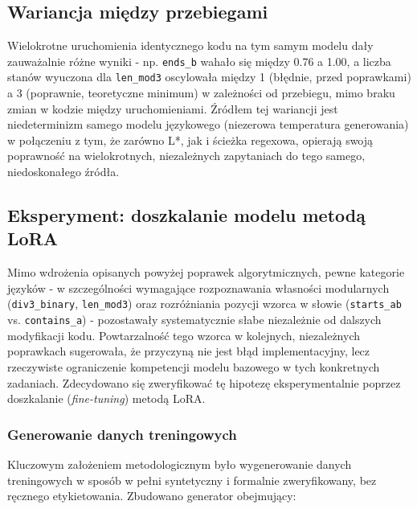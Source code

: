 \documentclass[12pt]{article}
\begin{document}
\subsection{Wariancja między przebiegami}
\label{subsec:wariancja}

Wielokrotne uruchomienia identycznego kodu na tym samym modelu dały zauważalnie różne wyniki - np. \texttt{ends\_b} wahało się między 0.76 a 1.00, a liczba stanów wyuczona dla \texttt{len\_mod3} oscylowała między 1 (błędnie, przed poprawkami) a 3 (poprawnie, teoretyczne minimum) w zależności od przebiegu, mimo braku zmian w kodzie między uruchomieniami. Źródłem tej wariancji jest niedeterminizm samego modelu językowego (niezerowa temperatura generowania) w połączeniu z tym, że zarówno L*, jak i ścieżka regexowa, opierają swoją poprawność na wielokrotnych, niezależnych zapytaniach do tego samego, niedoskonałego źródła. 

\subsection{Eksperyment: doszkalanie modelu metodą LoRA}
\label{subsec:finetuning} \cite{hu2022}

Mimo wdrożenia opisanych powyżej poprawek algorytmicznych, pewne kategorie języków - w szczególności wymagające rozpoznawania własności modularnych (\texttt{div3\_binary}, \texttt{len\_mod3}) oraz rozróżniania pozycji wzorca w słowie (\texttt{starts\_ab} vs. \texttt{contains\_a}) - pozostawały systematycznie słabe niezależnie od dalszych modyfikacji kodu. Powtarzalność tego wzorca w kolejnych, niezależnych poprawkach sugerowała, że przyczyną nie jest błąd implementacyjny, lecz rzeczywiste ograniczenie kompetencji modelu bazowego w tych konkretnych zadaniach. Zdecydowano się zweryfikować tę hipotezę eksperymentalnie poprzez doszkalanie (\emph{fine-tuning}) metodą LoRA.

\subsubsection{Generowanie danych treningowych}

Kluczowym założeniem metodologicznym było wygenerowanie danych treningowych w sposób w pełni syntetyczny i formalnie zweryfikowany, bez ręcznego etykietowania. Zbudowano generator obejmujący:
\end{document}
